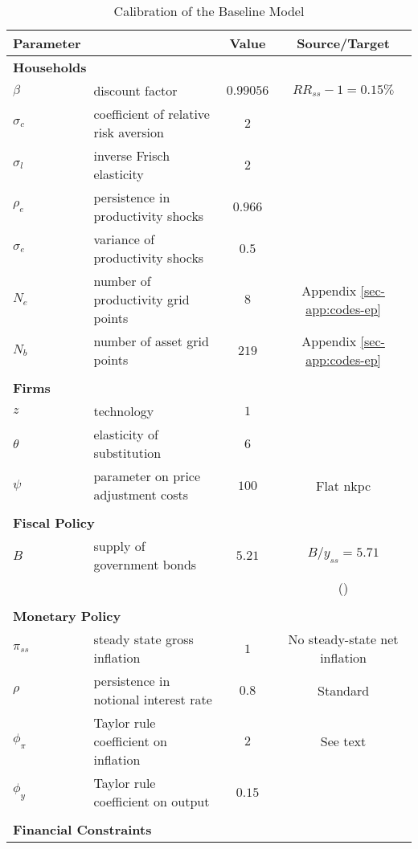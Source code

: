 \documentclass[12pt]{article} %
\numberwithin{equation}{section} %
\numberwithin{figure}{section}
\numberwithin{table}{section}
\begin{document}
\begin{table}[t]
\centering
\caption{Calibration of the Baseline Model}
\label{tab:calibration-baseline}
\begin{tabular}{llcc}
Parameter &   &  Value & Source/Target \\
\hline
\hline
\multicolumn{2}{l}{\textbf{Households}} & & \\
$\beta$ &  discount factor & $0.99056$ & $RR_{ss}-1 = 0.15\%$ \\
$\sigma_c$ & coefficient of relative risk aversion & $2$ & \textcite{auclert2021} \\
$\sigma_l$ & inverse Frisch elasticity & $2$ & \textcite{auclert2021} \\
$\rho_e$ & persistence in productivity shocks & $0.966$ & \textcite{auclert2021} \\
$\sigma_e$ & variance of productivity shocks & $0.5$ & \textcite{auclert2021} \\
$N_e$ & number of productivity grid points & $8$ & Appendix \ref{sec-app:codes-ep} \\
$N_b$ & number of asset grid points & $219$ & Appendix \ref{sec-app:codes-ep} \\
& & & \\
\multicolumn{2}{l}{\textbf{Firms}} & & \\
$z$ &  technology & $1$ & \\
$\theta$ & elasticity of substitution & $6$ & \textcite{auclert2021} \\
$\psi$ & parameter on price adjustment costs & $100$ & Flat \Gls{nkpc} \\
& & & \\
\multicolumn{2}{l}{\textbf{Fiscal Policy}} & & \\
$B$ & supply of government bonds & $5.21$ & $B/y_{ss} = 5.71$ \\
& & & (\cite{mckay2016}) \\
& & & \\
\multicolumn{2}{l}{\textbf{Monetary Policy}} & & \\
$\pi_{ss}$ & steady state gross inflation & $1$ & No steady-state net inflation \\
$\rho$ & persistence in notional interest rate & $0.8$ & Standard \\
$\phi_{\pi}$ & Taylor rule coefficient on inflation & $2$ & See text \\
$\phi_{y}$ & Taylor rule coefficient on output & $0.15$ & \\
& & & \\
\multicolumn{2}{l}{\textbf{Financial Constraints}} & & \\

\end{tabular}
\end{table}
\end{document}
